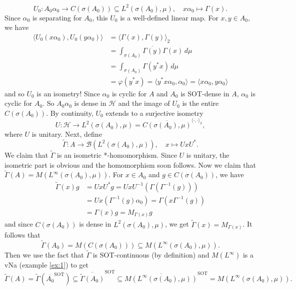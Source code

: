 \begin{myproof}
  $$U_0 : A_0 \alpha_0 \to C(\sigma(A_0)) \subseteq L^2 (\sigma(A_0), \mu),\quad x \alpha_0 \mapsto \Gamma(x).$$
  Since $\alpha_0$ is separating for $A_0$, this $U_0$ is a well-defined linear map.
  For $x, y \in A_0$, we have 
  \begin{align*}
    \langle U_0 (x \alpha_0), U_0 (y \alpha_0) \rangle &= \langle \Gamma(x), \Gamma(y)\rangle_2 \\
    &= \int_{\sigma (A_0)}  \overline{\Gamma(y)} \Gamma(x)\, d\mu\\
    &= \int_{\sigma (A_0)} \Gamma(y^* x)\, d\mu\\
    &= \varphi(y^* x) = \langle y^* x \alpha_0, \alpha_0 \rangle = \langle x \alpha_0, y \alpha_0\rangle
  \end{align*}
  and so $U_0$ is an isometry! Since $\alpha_0$ is cyclic for $A$ and $A_0$
  is SOT-dense in $A$, $\alpha_0$ is cyclic for $A_0$.
  So $A_0 \alpha_0$ is dense in $\mathcal{H}$ and the image of $U_0$ is the entire $C(\sigma(A_0))$.
  By continuity, $U_0$ extends to a surjective isometry 
  $$U : \mathcal{H} \to L^2 (\sigma(A_0), \mu) = \overline{C(\sigma(A_0), \mu)}^{\langle \cdot, \cdot \rangle_2},$$
  where $U$ is unitary. Next, define 
  $$\widetilde{\Gamma} : A \to \mathcal{B} (L^2 (\sigma(A_0), \mu)),\quad x \mapsto UxU^*.$$
  We claim that $\widetilde{\Gamma}$ is an isometric *-homomorphism. Since $U$ is unitary, the isometric part is obvious and the homomorphism soon follows.
  Now we claim that $\widetilde{\Gamma} (A) = M(L^\infty (\sigma(A_0), \mu))$.
  For $x \in A_0$ and $g \in C(\sigma(A_0))$, we have 
  \begin{align*}
    \widetilde{\Gamma} (x) g &= UxU^* g = U x U^{-1} (\Gamma (\Gamma^{-1} (g)))\\
    &= U x (\Gamma^{-1} (g)\alpha_0)= \Gamma (x \Gamma^{-1} (g))\\ 
    &= \Gamma(x) g = M_{\Gamma(x)} g
  \end{align*}
  and since $C(\sigma (A_0))$ is dense in $L^2 (\sigma(A_0), \mu)$, we get $\widetilde{\Gamma}(x) = M_{\Gamma(x)}$.
  It follows that 
  $$\widetilde{\Gamma} (A_0) = M(C(\sigma (A_0))) \subseteq M(L^\infty (\sigma(A_0), \mu)).$$
  Then we use the fact that $\widetilde{\Gamma}$ is SOT-continuous (by definition) and $M(L^\infty)$ is a vNa (example \ref{ex:1}) to get
  $$\widetilde{\Gamma} (A) = \widetilde{\Gamma} (\overline{A_0} ^{\mathrm{SOT}}) \subseteq \overline{\widetilde{\Gamma} (A_0)}^{\mathrm{SOT}} \subseteq \overline{M(L^\infty (\sigma(A_0), \mu))}^{\mathrm{SOT}} = M(L^\infty (\sigma(A_0), \mu)).$$

\end{myproof}
